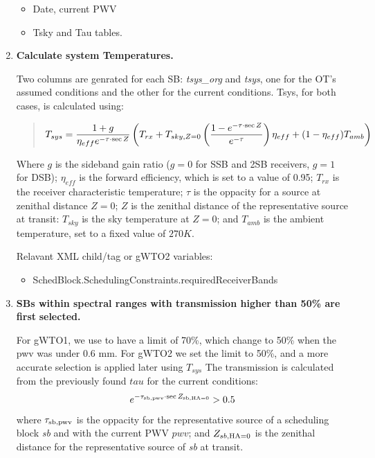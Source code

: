 \documentclass[a4paper,10pt,english]{sphinxmanual}
\begin{document}
\begin{enumerate}
\begin{itemize}
\item {} 
Date, current PWV

\item {} 
Tsky and Tau tables.

\end{itemize}

\item {} 
\textbf{Calculate system Temperatures.}

Two columns are genrated for each SB: \emph{tsys\_org} and \emph{tsys}, one for the
OT's assumed conditions and the other for the current conditions.
Tsys, for both cases, is calculated using:
\begin{quote}
\begin{gather}
\begin{split}T_{sys} = \frac{1 + g}{\eta_{eff} e^{-\tau \cdot \sec Z}}
\left(T_{rx} + T_{sky,Z=0} \left(\frac{1-e^{-\tau \cdot \sec Z}}{e^{-\tau}}\right)
\eta_{eff} + (1-\eta_{eff}) T_{amb}\right)\end{split}\notag
\end{gather}\end{quote}

Where \(g\) is the sideband gain ratio (\(g=0\) for SSB and 2SB
receivers, \(g=1\) for DSB); \(\eta_{eff}\) is the forward efficiency,
which is set to a value of 0.95; \(T_{rx}\) is the receiver characteristic
temperature; \(\tau\) is the oppacity for a source at zenithal distance
\(Z=0\); \(Z\) is the zenithal distance of the representative source
at transit: \(T_{sky}\) is the sky temperature at \(Z=0\); and
\(T_{amb}\) is the ambient temperature, set to a fixed value of
\(270K\).

Relavant XML child/tag or gWTO2 variables:
\begin{itemize}
\item {} 
SchedBlock.SchedulingConstraints.requiredReceiverBands

\end{itemize}

\item {} 
\textbf{SBs within spectral ranges with transmission higher than 50\% are first}
\textbf{selected.}

For gWTO1, we use to have a limit of 70\%, which change to 50\% when the pwv
was under 0.6 mm. For gWTO2 we set the limit to 50\%, and a more accurate
selection is applied later using \(T_{sys}\)
The transmission is calculated from the previously found \(tau\) for
the current conditions:
\begin{gather}
\begin{split}e^{-\tau_{\rm{sb,pwv}}\cdot \sec Z_{\rm{sb,HA}=0}} > 0.5\end{split}\notag
\end{gather}
where \(\tau_{\rm{sb,pwv}}\) is the oppacity for the representative source
of a scheduling block \emph{sb} and with the current PWV \(pwv\); and
\(Z_{sb,\rm{HA}=0}\) is the zenithal distance for the representative source
of \emph{sb} at transit.


\end{enumerate}
\end{document}
